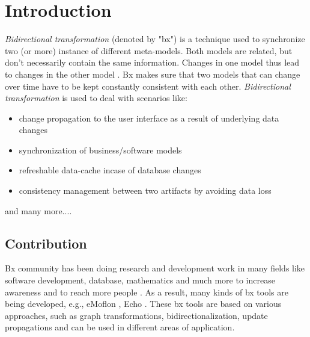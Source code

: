 \section{Introduction}\label{sec:introduction}
 \textit{Bidirectional transformation} (denoted by "bx") is a technique used to synchronize two (or more) instance of different meta-models. Both models are related, but don't necessarily contain the same information. Changes in one model thus lead to changes in the other model \cite{bx-grace}. Bx makes sure that two models that can change over time have to be kept constantly consistent with each other.
\newline\newline\textit{Bidirectional transformation} is used to deal with scenarios like:
\begin{itemize}
	\item {change propagation to the user interface as a result of underlying data changes}	
	\item {synchronization of business/software models}
	\item {refreshable data-cache incase of database changes}
	\item {consistency management between two artifacts by avoiding data loss}
\end{itemize}
    and many more....

\subsection{Contribution}\label{subsec:contribution}    
Bx community has been doing research and development work in many fields like software development, database, mathematics and much more to increase awareness and to reach more people \cite{bx-dagstuhl}\cite{bx-grace}. As a result, many kinds of bx tools are being developed, e.g., eMoflon \cite{emoflon-part4}, Echo \cite{echo}. These bx tools are based on various approaches, such as graph transformations, bidirectionalization, update propagations \cite{bx-community} and can be used in different areas of application.

